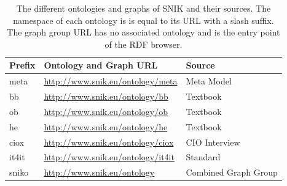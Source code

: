 \documentclass[conference]{IEEEtran}
\begin{document}
\begin{table}[tbh]
\caption{The different ontologies and graphs of SNIK and their sources.
The namespace of each ontology is is equal to its URL with a slash suffix.
The graph group URL has no associated ontology and is the entry point of the RDF browser.
}
\label{tab:source}
\begin{center}
\begin{tabular}{lll}
\toprule
\textbf{Prefix}	&\textbf{Ontology and Graph URL}			&\textbf{Source}\\		
\midrule
meta			&\url{http://www.snik.eu/ontology/meta}		&Meta Model\\
bb				&\url{http://www.snik.eu/ontology/bb}		&Textbook~\cite{bb}\\
ob				&\url{http://www.snik.eu/ontology/ob}		&Textbook~\cite{ob}\\
he				&\url{http://www.snik.eu/ontology/he}		&Textbook~\cite{he}\\
ciox			&\url{http://www.snik.eu/ontology/ciox}		&CIO Interview\\
it4it			&\url{http://www.snik.eu/ontology/it4it}	&Standard~\cite{it4it}\\
\midrule
sniko			&\url{http://www.snik.eu/ontology}			&Combined Graph Group\\
\bottomrule
\end{tabular}
\end{center}
\end{table}
\end{document}
